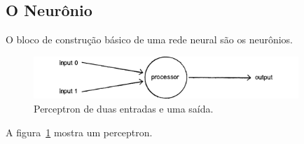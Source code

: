 \subsection{O Neurônio}

O bloco de construção básico de uma rede neural são os neurônios.

\begin{figure}[H]
  \centering
  \includegraphics[width=10cm]{figuras/rede_neural_perceptron}
  \caption{Perceptron de duas entradas e uma saída.}\label{fig:rede_neural_perceptron}
\end{figure}

A figura~\ref{fig:rede_neural_perceptron} mostra um perceptron.


